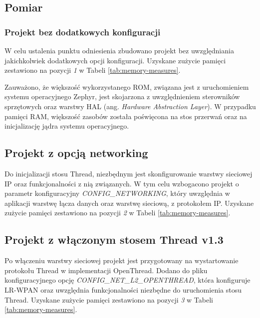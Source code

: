     \subsection{Pomiar}
    \label{subsec:mem-footprint-measure}

        \subsubsection{Projekt bez dodatkowych konfiguracji}
        
        W celu ustalenia punktu odniesienia zbudowano projekt bez uwzględniania jakichkolwiek dodatkowych opcji konfiguracji.
        Uzyskane zużycie pamięci zestawiono na pozycji \textit{1} w Tabeli \ref{tab:memory-measures}.
        
        Zauważono, że większość wykorzystanego ROM, związana jest z uruchomieniem systemu operacyjnego Zephyr, jest skojarzona z uwzględnieniem sterowników sprzętowych oraz warstwy HAL (ang. \textit{Hardware Abstraction Layer}). W przypadku pamięci RAM, większość zasobów została poświęcona na stos przerwań oraz na inicjalizację jądra systemu operacyjnego.

        \subsection{Projekt z opcją networking}

        Do inicjalizacji stosu Thread, niezbędnym jest skonfigurowanie warstwy sieciowej IP oraz funkcjonalności z nią związanych. W tym celu wzbogacono projekt o parametr konfiguracyjny \textit{CONFIG\_NETWORKING}, który uwzględnia w aplikacji warstwę łącza danych oraz warstwę sieciową, z protokołem IP.
        Uzyskane zużycie pamięci zestawiono na pozycji \textit{2} w Tabeli \ref{tab:memory-measures}.

        \subsection{Projekt z włączonym stosem Thread v1.3}

        Po włączeniu warstwy sieciowej projekt jest przygotowany na wystartowanie protokołu Thread w implementacji OpenThread. Dodano do pliku konfiguracyjnego opcję \textit{CONFIG\_NET\_L2\_OPENTHREAD}, która konfiguruje LR-WPAN oraz uwzględnia funkcjonalności niezbędne do uruchomienia stosu Thread. Uzyskane zużycie pamięci zestawiono na pozycji \textit{3} w Tabeli \ref{tab:memory-measures}.

